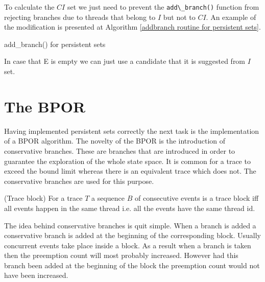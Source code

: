 To calculate the $CI$ set we just need to prevent the \verb|add\_branch()| function from rejecting branches due to threads that belong to $I$ but not to $CI$.
An example of the modification is presented at Algorithm \ref{addbranch routine for persistent sets}.

\begin{algorithm}
    \caption{add\_branch() for persistent sets}
    \label{addbranch routine for persistent sets}
\end{algorithm}

In case that E is empty we can just use a candidate that it is suggested from $I$ set.

\section{The BPOR}
Having implemented persistent sets correctly the next task is the implementation of a BPOR algorithm. The novelty of the BPOR is the introduction of conservative branches. These
are branches that are introduced in order to guarantee the exploration of the whole state space. It is common for a trace to exceed the bound limit whereas there is
an equivalent trace which does not. The conservative branches are used for this purpose.

\begin{definition}{(Trace block)}
For a trace $T$ a sequence $B$ of consecutive events is a trace block iff all events happen in the same thread i.e. all the events have the same thread id.
\end{definition}

The idea behind conservative branches is quit simple. When a branch is added a conservative branch is added at the beginning of the corresponding block.
Usually concurrent events take place inside a block. As a result when a branch is taken then the preemption count will most probably increased. However had this
branch been added at the beginning of the block the preemption count would not have been increased. 

